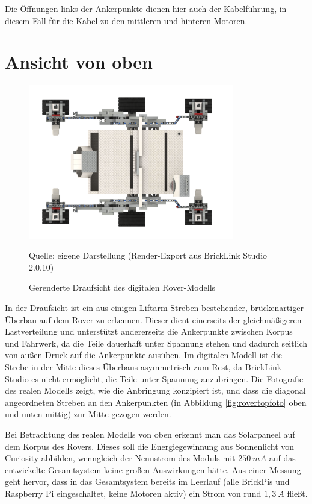 Die Öffnungen links der Ankerpunkte dienen hier auch der Kabelführung, in diesem Fall für die Kabel zu den mittleren und hinteren Motoren.

\section{Ansicht von oben}
\label{sec:draufsicht}

\begin{figure}
	\centering
	\includegraphics[width=0.8\textwidth]{../Images/20200429_Mars_Rover_V5_top.png}
	\vspace{0.5em}
	\parbox[c]{0.8\linewidth}{\footnotesize
		\centering
		\vspace{1em}
		Quelle: eigene Darstellung (Render-Export aus BrickLink Studio 2.0.10)
	}
	\caption{Gerenderte Draufsicht des digitalen Rover-Modells}
	\label{fig:rovertoprender}
\end{figure}

In der Draufsicht ist ein aus einigen Liftarm-Streben bestehender, brückenartiger Überbau auf dem Rover zu erkennen.
Dieser dient einerseits der gleichmäßigeren Lastverteilung und unterstützt andererseits die Ankerpunkte zwischen Korpus und Fahrwerk, da die Teile dauerhaft unter Spannung stehen und dadurch seitlich von außen Druck auf die Ankerpunkte ausüben.
Im digitalen Modell ist die Strebe in der Mitte dieses Überbaus asymmetrisch zum Rest, da BrickLink Studio es nicht ermöglicht, die Teile unter Spannung anzubringen.
Die Fotografie des realen Modells zeigt, wie die Anbringung konzipiert ist, und dass die diagonal angeordneten Streben an den Ankerpunkten (in Abbildung \ref{fig:rovertopfoto} oben und unten mittig) zur Mitte gezogen werden.

Bei Betrachtung des realen Modells von oben erkennt man das Solarpaneel auf dem Korpus des Rovers.
Dieses soll die Energiegewinnung aus Sonnenlicht von Curiosity abbilden, wenngleich der Nennstrom des Moduls mit $250\ mA$ auf das entwickelte Gesamtsystem keine großen Auswirkungen hätte.
Aus einer Messung geht hervor, dass in das Gesamtsystem bereits im Leerlauf (alle BrickPis und Raspberry Pi eingeschaltet, keine Motoren aktiv) ein Strom von rund $1,3\ A$ fließt.


